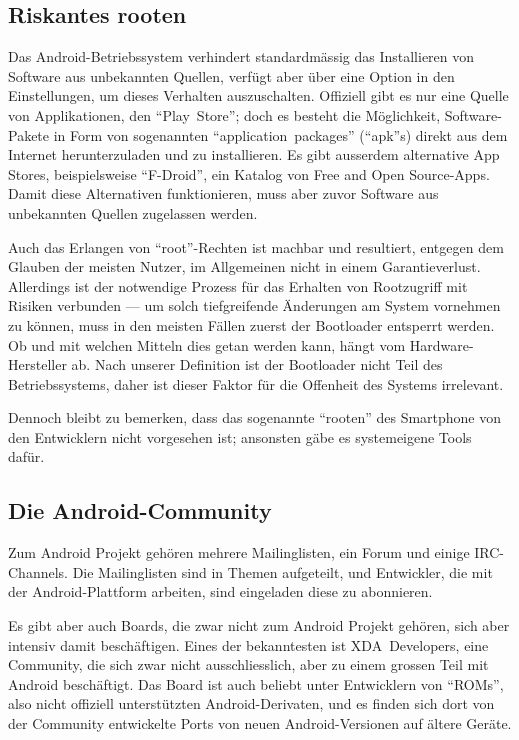 \subsection{Riskantes rooten}
Das \mbox{Android-Betriebssystem} verhindert standardmässig das Installieren von Software aus unbekannten Quellen, verfügt aber über eine Option in den Einstellungen, um dieses Verhalten auszuschalten. Offiziell gibt es nur eine Quelle von Applikationen, den ``\mbox{Play Store}''; doch es besteht die Möglichkeit, \mbox{Software-Pakete} in Form von sogenannten ``\mbox{application packages}'' (``apk''s) direkt aus dem Internet herunterzuladen und zu installieren. Es gibt ausserdem alternative App Stores, beispielsweise ``\mbox{F-Droid}'', ein Katalog von Free and Open \mbox{Source-Apps}\thinspace\cite{online:f-droid}. Damit diese Alternativen funktionieren, muss aber zuvor Software aus unbekannten Quellen zugelassen werden.

Auch das Erlangen von \mbox{``root''-Rechten} ist machbar und resultiert, entgegen dem Glauben der meisten Nutzer, im Allgemeinen nicht in einem Garantieverlust\thinspace\cite{online:xda-rooting-warranty}. Allerdings ist der notwendige Prozess für das Erhalten von Rootzugriff mit Risiken verbunden --- um solch tiefgreifende Änderungen am System vornehmen zu können, muss in den meisten Fällen zuerst der Bootloader entsperrt werden. 
Ob und mit welchen Mitteln dies getan werden kann, hängt vom Hardware-Hersteller ab\thinspace\cite{online:apu-what-is-unlocking}. Nach unserer Definition ist der Bootloader nicht Teil des Betriebssystems, daher ist dieser Faktor für die Offenheit des Systems irrelevant.

Dennoch bleibt zu bemerken, dass das sogenannte ``rooten'' des Smartphone von den Entwicklern nicht vorgesehen ist; ansonsten gäbe es systemeigene Tools dafür.
\newline

\subsection{Die Android-Community}
Zum Android Projekt gehören mehrere Mailinglisten, ein Forum und einige \mbox{IRC-Channels}\thinspace\cite{online:android-community}. Die Mailinglisten sind in Themen aufgeteilt, und Entwickler, die mit der \mbox{Android-Plattform} arbeiten, sind eingeladen diese zu abonnieren\thinspace\cite{online:android-community}.

Es gibt aber auch Boards, die zwar nicht zum Android Projekt gehören, sich aber intensiv damit beschäftigen. Eines der bekanntesten ist \mbox{XDA Developers}\thinspace\cite{online:xda-developers}, eine Community, die sich zwar nicht ausschliesslich, aber zu einem grossen Teil mit Android beschäftigt. Das Board ist auch beliebt unter Entwicklern von ``ROMs'', also nicht offiziell unterstützten Android-Derivaten, und es finden sich dort von der Community entwickelte Ports von neuen Android-Versionen auf ältere Geräte.
\newline

